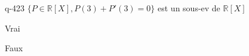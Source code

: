 \begin{truefalse}{q-423}
$\{ P \in \mathbb R[X], P(3)+P'(3)=0\}$ est un sous-ev de $\mathbb R[X]$
\item* Vrai
\item Faux
\end{truefalse}

